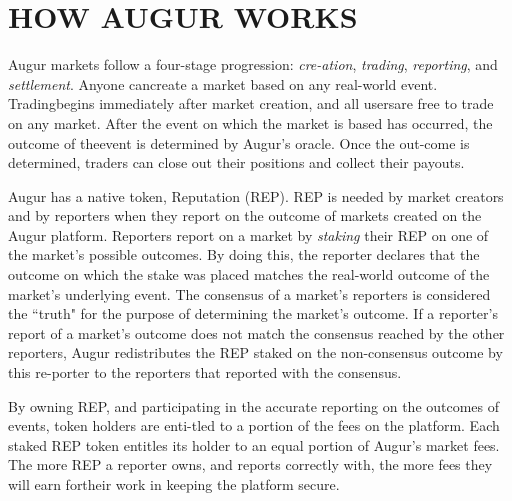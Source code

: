 \documentclass[12pt,floatfix,reprint,nofootinbib,amsmath,amssymb,epsfig,pre,floats,letterpaper,groupedaffiliation]{revtex4-1}
\theoremstyle{definition}
\theoremstyle{definition}
\begin{document}
\section{HOW AUGUR WORKS}

\vspace{0pt plus 20pt}

Augur markets follow a four-stage progression: \textit{cre-\linebreak ation}, \textit{trading}, \textit{reporting}, and \textit{settlement}. Anyone can\linebreak create a market based on any real-world event. Trading\linebreak begins immediately after market creation, and all users\linebreak are free to trade on any market. After the event on which the market is based has occurred, the outcome of the\linebreak event is determined by Augur's oracle. Once the out-\linebreak come is determined, traders can close out their positions and collect their payouts.

\vspace{0pt plus 20pt}

Augur has a native token, Reputation (REP). REP is needed by market creators and by reporters when they report on the outcome of markets created on the Augur platform. Reporters report on a market by \textit{staking} their REP on one of the market's possible outcomes. By doing this, the reporter declares that the outcome on which the stake was placed matches the real-world outcome of the market's underlying event. The consensus of a market's reporters is considered the ``truth" for the purpose of determining the market's outcome. If a reporter's report of a market's outcome does not match the consensus reached by the other reporters, Augur redistributes the REP staked on the non-consensus outcome by this re-\linebreak porter to the reporters that reported with the consensus.

\vspace{0pt plus 20pt}

By owning REP, and participating in the accurate re\-porting on the outcomes of events, token holders are enti-\linebreak tled to a portion of the fees on the platform. Each staked REP token entitles its holder to an equal portion of Au\-gur's market fees. The more REP a reporter owns, and reports correctly with, the more fees they will earn for\linebreak their work in keeping the platform secure.
\end{document}
